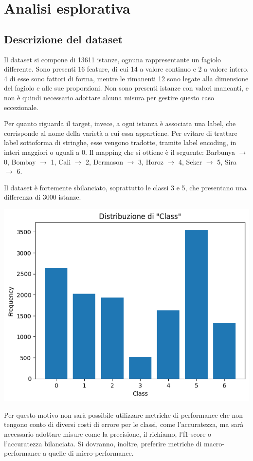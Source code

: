 \section{Analisi esplorativa}
\subsection{Descrizione del dataset}
Il dataset si compone di 13611 istanze, ognuna rappresentante un fagiolo
differente.
Sono presenti 16 feature, di cui 14 a valore continuo e 2 a valore intero.
4 di esse sono fattori di forma, mentre
le rimanenti 12 sono legate alla dimensione del fagiolo e alle
sue proporzioni.
Non sono presenti istanze con valori mancanti, e non è quindi necessario
adottare alcuna misura per gestire questo caso eccezionale.

Per quanto riguarda il target, invece, a ogni istanza è associata una label,
che corrisponde al nome della varietà a cui
essa appartiene. Per evitare di trattare label sottoforma di stringhe,
esse vengono tradotte, tramite label encoding, in interi maggiori o uguali a 0.
Il mapping che si ottiene è il seguente: Barbunya $\rightarrow$ 0, 
Bombay $\rightarrow$ 1, Cali $\rightarrow$ 2, Dermason $\rightarrow$ 3,
Horoz $\rightarrow$ 4, Seker $\rightarrow$ 5, Sira $\rightarrow$ 6.

Il dataset è fortemente sbilanciato, soprattutto le classi 3 e 5, che
presentano una differenza di 3000 istanze. 
\begin{Figure}
    \centering
    \includegraphics[width=\linewidth]{img/unbalanced_dataset.png}
\end{Figure}
Per questo motivo non sarà possibile
utilizzare metriche di performance che non tengono conto di diversi costi
di errore per le classi, come l'accuratezza, ma sarà necessario adottare misure
come la precisione, il richiamo, l'f1-score o l'accuratezza bilanciata.
Si dovranno, inoltre, preferire metriche di macro-performance a quelle di 
micro-performance.

